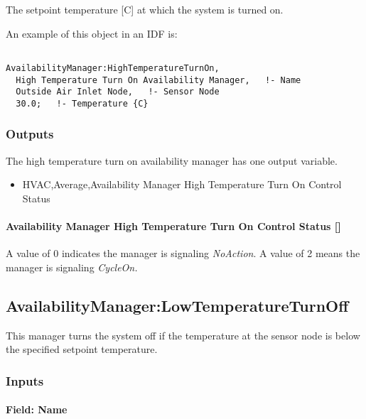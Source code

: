 The setpoint temperature {[}C{]} at which the system is turned on.

An example of this object in an IDF is:

\begin{lstlisting}

AvailabilityManager:HighTemperatureTurnOn,
  High Temperature Turn On Availability Manager,   !- Name
  Outside Air Inlet Node,   !- Sensor Node
  30.0;   !- Temperature {C}
\end{lstlisting}

\subsubsection{Outputs}\label{outputs-5-010}

The high temperature turn on availability manager has one output variable.

\begin{itemize}
\tightlist
\item
  HVAC,Average,Availability Manager High Temperature Turn On Control Status
\end{itemize}

\paragraph{Availability Manager High Temperature Turn On Control Status {[]}}\label{availability-manager-high-temperature-turn-on-control-status}

A value of 0 indicates the manager is signaling \emph{NoAction}. A value of 2 means the manager is signaling \emph{CycleOn.}

\subsection{AvailabilityManager:LowTemperatureTurnOff}\label{availabilitymanagerlowtemperatureturnoff}

This manager turns the system off if the temperature at the sensor node is below the specified setpoint temperature.

\subsubsection{Inputs}\label{inputs-7-027}

\paragraph{Field: Name}\label{field-name-6-023}

